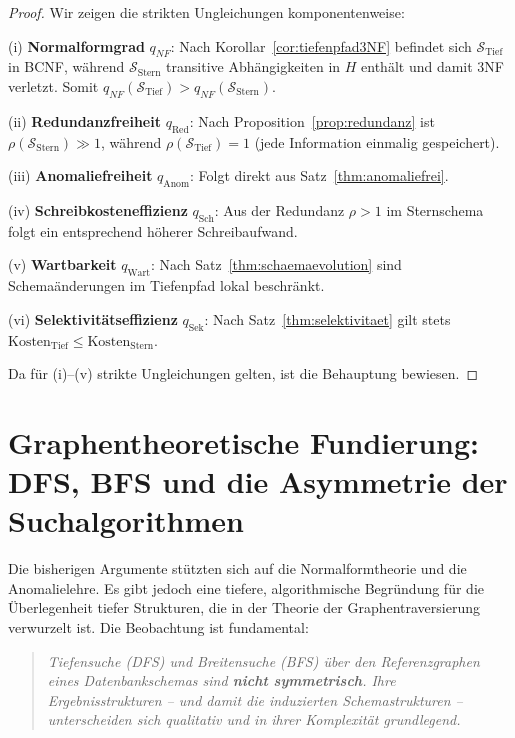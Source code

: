 ﻿\documentclass[12pt,a4paper]{article}
\theoremstyle{definition}
\theoremstyle{remark}
\newcommand{\NF}{\mathit{NF}}
\begin{document}
\begin{proof}
Wir zeigen die strikten Ungleichungen komponentenweise:

\medskip
(i) \textbf{Normalformgrad} $q_{\NF}$: Nach Korollar~\ref{cor:tiefenpfad3NF}
befindet sich $\mathcal{S}_{\text{Tief}}$ in BCNF, während
$\mathcal{S}_{\text{Stern}}$ transitive Abhängigkeiten in $H$ enthält
und damit 3NF verletzt. Somit $q_{\NF}(\mathcal{S}_{\text{Tief}}) > q_{\NF}(\mathcal{S}_{\text{Stern}})$.

(ii) \textbf{Redundanzfreiheit} $q_{\text{Red}}$: Nach Proposition~\ref{prop:redundanz}
ist $\rho(\mathcal{S}_{\text{Stern}}) \gg 1$, während
$\rho(\mathcal{S}_{\text{Tief}}) = 1$ (jede Information einmalig gespeichert).

(iii) \textbf{Anomaliefreiheit} $q_{\text{Anom}}$: Folgt direkt aus
Satz~\ref{thm:anomaliefrei}.

(iv) \textbf{Schreibkosteneffizienz} $q_{\text{Sch}}$: Aus der Redundanz
$\rho > 1$ im Sternschema folgt ein entsprechend höherer Schreibaufwand.

(v) \textbf{Wartbarkeit} $q_{\text{Wart}}$: Nach Satz~\ref{thm:schaemaevolution}
sind Schemaänderungen im Tiefenpfad lokal beschränkt.

(vi) \textbf{Selektivitätseffizienz} $q_{\text{Sek}}$: Nach
Satz~\ref{thm:selektivitaet} gilt stets
$\text{Kosten}_{\text{Tief}} \leq \text{Kosten}_{\text{Stern}}$.

Da für (i)--(v) strikte Ungleichungen gelten, ist die Behauptung bewiesen.
\end{proof}

\section{Graphentheoretische Fundierung: DFS, BFS und die Asymmetrie der Suchalgorithmen}
\label{sec:dfs_bfs}

Die bisherigen Argumente stützten sich auf die Normalformtheorie und die
Anomalielehre. Es gibt jedoch eine tiefere, algorithmische Begründung für
die Überlegenheit tiefer Strukturen, die in der Theorie der Graphentraversierung
verwurzelt ist. Die Beobachtung ist fundamental:

\begin{quote}
\emph{Tiefensuche (DFS) und Breitensuche (BFS) über den Referenzgraphen eines
Datenbankschemas sind \textbf{nicht symmetrisch}. Ihre Ergebnisstrukturen --
und damit die induzierten Schemastrukturen -- unterscheiden sich qualitativ
und in ihrer Komplexität grundlegend.}
\end{quote}
\end{document}
